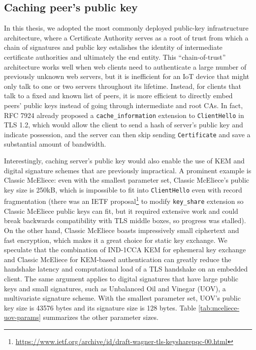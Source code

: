 \documentclass[letterpaper,12pt,titlepage,oneside,final]{book}
\begin{document}
\subsection{Caching peer's public key}\label{sec:using-classic-mceliece}
In this thesis, we adopted the most commonly deployed public-key infrastructure architecture, where a Certificate Authority serves as a root of trust from which a chain of signatures and public key estalishes the identity of intermediate certificate authorities and ultimately the end entity.
This ``chain-of-trust'' architecture works well when web clients need to authenticate a large number of previously unknown web servers, but it is inefficient for an IoT device that might only talk to one or two servers throughout its lifetime.
Instead, for clients that talk to a fixed and known list of peers, it is more efficient to directly embed peers' public keys instead of going through intermediate and root CAs.
In fact, RFC 7924 \cite{DBLP:journals/rfc/rfc7924} already proposed a \texttt{cache\_information} extension to \texttt{ClientHello} in TLS 1.2, which would allow the client to send a hash of server's public key and indicate possession, and the server can then skip sending \texttt{Certificate} and save a substantial amount of bandwidth.

Interestingly, caching server's public key would also enable the use of KEM and digital signature schemes that are previously impractical.
A prominent example is Classic McEliece: even with the smallest parameter set, Classic McEliece's public key size is 250kB, which is impossible to fit into \texttt{ClientHello} even with record fragmentation (there was an IETF proposal\footnote{\url{https://www.ietf.org/archive/id/draft-wagner-tls-keysharepqc-00.html}} to modify \texttt{key\_share} extension so Classic McEliece public keys can fit, but it required extensive work and could break backwards compatibility with TLS middle boxes, so progress was stalled).
On the other hand, Classic McEliece boasts impressively small ciphertext and fast encryption, which makes it a great choice for static key exchange.
We speculate that the combination of IND-1CCA KEM for ephemeral key exchange and Classic McEliece for KEM-based authentication can greatly reduce the handshake latency and computational load of a TLS handshake on an embedded client.
The same argument applies to digital signatures that have large public keys and small signatures, such as Unbalanced Oil and Vinegar (UOV), a multivariate signature scheme.
With the smallest parameter set, UOV's public key size is 43576 bytes and its signature size is 128 bytes.
Table \ref{tab:mceliece-uov-params} summarizes the other parameter sizes.
\end{document}

